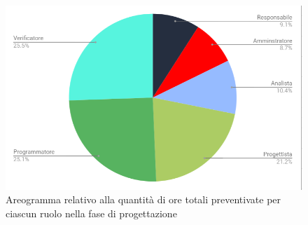 \begin{figure}[h!]
	\caption{Areogramma relativo alla quantità di ore totali preventivate per ciascun ruolo nella fase di progettazione}
    \includegraphics[width=1\textwidth]{./src/Preventivo/src/img/TortaProj.png}  
\end{figure}


